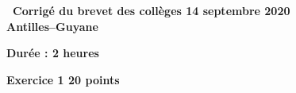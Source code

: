 \documentclass[10pt]{article}
\begin{document}
\setlength\parindent{0mm}
\pagestyle{fancy}
\thispagestyle{empty}
\begin{center}

{\Large \textbf{\decofourleft~Corrigé du brevet des collèges 14 septembre  2020~\decofourright\\[5pt] Antilles--Guyane}}

\bigskip

\textbf{Durée : 2 heures} 

\medskip

\end{center}

\textbf{Exercice 1 \hfill 20 points}

\medskip

%
\end{document}
